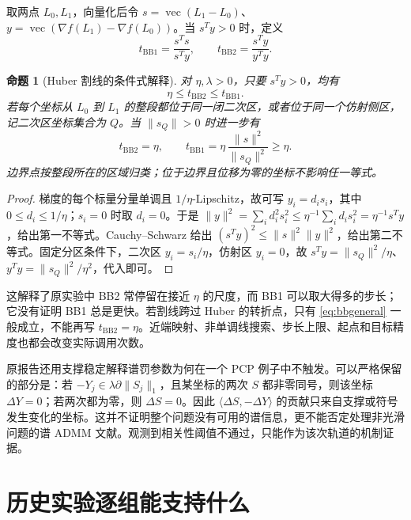 \documentclass[UTF8,fontset=none,zihao=-4,a4paper]{ctexart}
\theoremstyle{plainzh}
\newtheorem{proposition}{命题}[section]
\newcommand{\ip}[2]{\langle #1,#2\rangle}
\numberwithin{equation}{section}
\begin{document}
取两点 $L_0,L_1$，向量化后令 $s=\operatorname{vec}(L_1-L_0)$、$y=\operatorname{vec}(\nabla f(L_1)-\nabla f(L_0))$。当 $s^Ty>0$ 时，定义
\begin{equation}
 t_{\mathrm{BB1}}=\frac{s^Ts}{s^Ty},\qquad
 t_{\mathrm{BB2}}=\frac{s^Ty}{y^Ty}.
\end{equation}
\begin{proposition}[Huber 割线的条件式解释]\label{prop:bb}
对 $\eta,\lambda>0$，只要 $s^Ty>0$，均有
\begin{equation}\label{eq:bbgeneral}
 \eta\leq t_{\mathrm{BB2}}\leq t_{\mathrm{BB1}}.
\end{equation}
若每个坐标从 $L_0$ 到 $L_1$ 的整段都位于同一闭二次区，或者位于同一个仿射侧区，记二次区坐标集合为 $Q$。当 $\|s_Q\|>0$ 时进一步有
\begin{equation}\label{eq:bbexact}
 t_{\mathrm{BB2}}=\eta,\qquad
 t_{\mathrm{BB1}}=\eta\,\frac{\|s\|^2}{\|s_Q\|^2}\geq\eta.
\end{equation}
边界点按整段所在的区域归类；位于边界且位移为零的坐标不影响任一等式。
\end{proposition}
\begin{proof}
梯度的每个标量分量单调且 $1/\eta$-Lipschitz，故可写 $y_i=d_i s_i$，其中 $0\leq d_i\leq1/\eta$；$s_i=0$ 时取 $d_i=0$。于是
$\|y\|^2=\sum_i d_i^2s_i^2\leq\eta^{-1}\sum_i d_is_i^2=\eta^{-1}s^Ty$，给出第一不等式。Cauchy--Schwarz 给出 $(s^Ty)^2\leq\|s\|^2\|y\|^2$，给出第二不等式。固定分区条件下，二次区 $y_i=s_i/\eta$，仿射区 $y_i=0$，故
$s^Ty=\|s_Q\|^2/\eta$、$y^Ty=\|s_Q\|^2/\eta^2$，代入即可。
\end{proof}

这解释了原实验中 BB2 常停留在接近 $\eta$ 的尺度，而 BB1 可以取大得多的步长；它没有证明 BB1 总是更快。若割线跨过 Huber 的转折点，只有 \eqref{eq:bbgeneral} 一般成立，不能再写 $t_{\mathrm{BB2}}=\eta$。近端映射、非单调线搜索、步长上限、起点和目标精度也都会改变实际调用次数。

原报告还用支撑稳定解释谱罚参数为何在一个 PCP 例子中不触发。可以严格保留的部分是：若 $-Y_j\in\lambda\partial\|S_j\|_1$，且某坐标的两次 $S$ 都非零同号，则该坐标 $\Delta Y=0$；若两次都为零，则 $\Delta S=0$。因此 $\ip{\Delta S}{-\Delta Y}$ 的贡献只来自支撑或符号发生变化的坐标。这并不证明整个问题没有可用的谱信息，更不能否定处理非光滑问题的谱 ADMM 文献\cite{aadmm}。观测到相关性阈值不通过，只能作为该次轨道的机制证据。

\section{历史实验逐组能支持什么}
\end{document}
